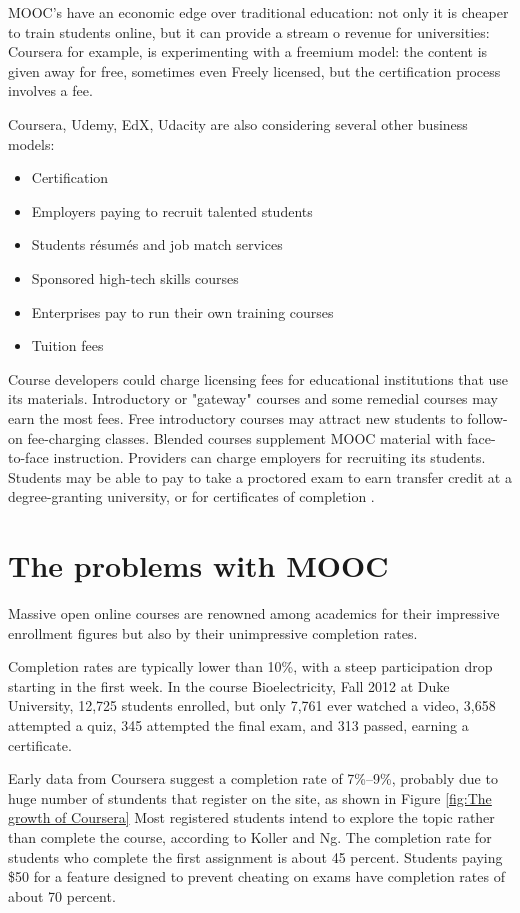 MOOC's have an economic edge over traditional education: not only it is cheaper
to train students online, but it can provide a stream o revenue for
universities: Coursera for example, is experimenting with a freemium model: the
content is given away for free, sometimes even Freely licensed, but the
certification process involves a fee.

Coursera, Udemy, EdX, Udacity are also considering several other business models:
\begin{itemize}
\item Certification
\item Employers paying to recruit talented students
\item Students résumés and job match services
\item Sponsored high-tech skills courses
\item Enterprises pay to run their own training courses
\item Tuition fees
\end{itemize}

Course developers could charge licensing fees for educational institutions that
use its materials. Introductory or "gateway" courses and some remedial courses
may earn the most fees. Free introductory courses may attract new students to
follow-on fee-charging classes. Blended courses supplement MOOC material with
face-to-face instruction. Providers can charge employers for recruiting its
students. Students may be able to pay to take a proctored exam to earn transfer
credit at a degree-granting university, or for certificates of completion
\citep{profitsofelearning}.

\section{The problems with MOOC}
Massive open online courses are renowned among academics for their
impressive enrollment figures but also by their unimpressive completion
rates.

Completion rates are typically lower than 10\%, with a steep participation drop
starting in the first week. In the course Bioelectricity, Fall 2012 at Duke
University, 12,725 students enrolled, but only 7,761 ever watched a video, 3,658
attempted a quiz, 345 attempted the final exam, and 313 passed, earning a
certificate.\citep{mooc_completion_rates}

Early data from Coursera suggest a completion rate of 7\%–9\%, probably due to
huge number of stundents that register on the site, as shown in Figure \ref{fig:The growth of Coursera}
 Most registered students intend to explore the topic rather than complete the course,
according to Koller and Ng. The completion rate for students who complete the
first assignment is about 45 percent. Students paying \$50 for a feature designed
to prevent cheating on exams have completion rates of about 70 percent.


